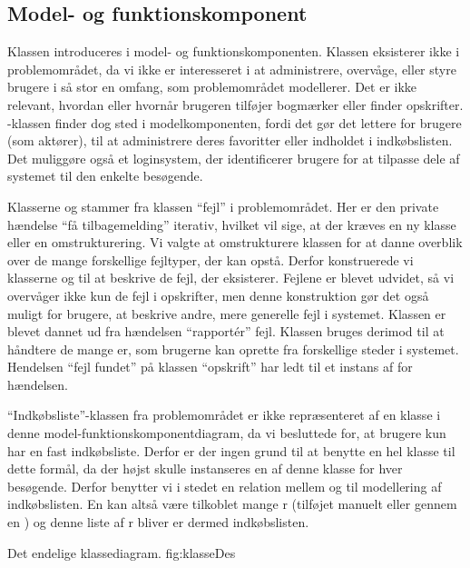 \subsection{Model- og funktionskomponent}
\label{sec:modelfunktion}
%

Klassen  introduceres i model- og funktionskomponenten.
Klassen eksisterer ikke i problemområdet, da vi ikke er interesseret
i at administrere, overvåge, eller styre brugere i så stor en omfang,
som problemområdet modellerer. Det er \fx ikke relevant, hvordan
eller hvornår brugeren tilføjer bogmærker eller finder opskrifter.
-klassen finder dog sted i modelkomponenten, fordi
det gør det lettere for brugere (som aktører), til \fx at administrere
deres favoritter eller indholdet i indkøbslisten. Det muliggøre også et
loginsystem, der identificerer brugere for at tilpasse dele af systemet
til den enkelte besøgende.

Klasserne  og  stammer
fra klassen ``fejl'' i problemområdet. Her er den private hændelse
``få tilbagemelding'' iterativ, hvilket vil sige, at der kræves en ny
klasse eller en omstrukturering. Vi valgte at omstrukturere klassen
for at danne overblik over de mange forskellige fejltyper, der kan
opstå. Derfor konstruerede vi klasserne  og
 til at beskrive de fejl, der eksisterer. Fejlene
er blevet udvidet, så vi overvåger ikke kun de fejl i opskrifter,
men denne konstruktion gør det også muligt for brugere, at beskrive
andre, mere generelle fejl i systemet. Klassen 
er blevet dannet ud fra hændelsen ``rapport\'{e}r'' fejl. Klassen
 bruges derimod til at håndtere de mange
er, som brugerne kan oprette fra forskellige
steder i systemet. Hendelsen ``fejl fundet'' på klassen ``opskrift'' har
\fx ledt til et instans af  for hændelsen.

``Indkøbsliste''-klassen fra problemområdet er ikke repræsenteret af en
klasse i denne model-funktionskomponentdiagram, da vi besluttede for, at
brugere kun har en fast indkøbsliste. Derfor er der ingen grund til at
benytte en hel klasse til dette formål, da der højst skulle instanseres
en af denne klasse for hver besøgende. Derfor benytter vi i stedet en
relation mellem  og  til modellering
af indkøbslisten. En  kan altså være tilkoblet mange
r (tilføjet manuelt eller gennem en )
og denne liste af r bliver er dermed indkøbslisten.


	{Det endelige klassediagram.}
	{fig:klasseDes}
